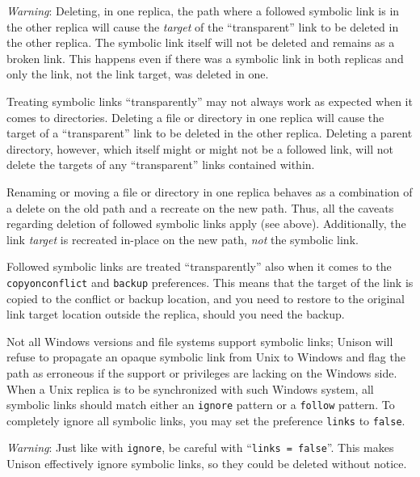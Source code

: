 \documentclass{article}
\begin{document}
{\em Warning}: Deleting, in one replica, the path where a followed symbolic
link is in the other replica will cause the {\em target} of the ``transparent''
link to be deleted in the other replica. The symbolic link itself will not be
deleted and remains as a broken link. %
This happens even if there was a symbolic link in both replicas and only the
link, not the link target, was deleted in one.

Treating symbolic links ``transparently'' may not always work as expected when
it comes to directories. Deleting a file or directory in one replica will cause
the target of a ``transparent'' link to be deleted in the other replica.
Deleting a parent directory, however, which itself might or might not be a
followed link, will not delete the targets of any ``transparent'' links
contained within. %

Renaming or moving a file or directory in one replica behaves as a combination
of a delete on the old path and a recreate on the new path. Thus, all the
caveats regarding deletion of followed symbolic links apply (see above).
Additionally, the link {\em target} is recreated in-place on the new path,
{\em not} the symbolic link.

Followed symbolic links are treated ``transparently'' also when it comes to the
\verb|copyonconflict| and \verb|backup| preferences. This means that the target
of the link is copied to the conflict or backup location, and you need to
restore to the original link target location outside the replica, should you
need the backup. %

Not all Windows versions and file systems support symbolic links; Unison will
refuse to propagate an opaque symbolic link from Unix to Windows and flag the
path as erroneous if the support or privileges are lacking on the Windows side.
When a Unix replica is to be synchronized with such Windows system, all symbolic
links should match either an \verb|ignore| pattern or a \verb|follow| pattern.
To completely ignore all symbolic links, you may set the preference {\tt links}
to {\tt false}.

{\em Warning}: Just like with \verb|ignore|, be careful with ``{\tt links =
false}''. This makes Unison effectively ignore symbolic links, so they could be
deleted without notice.
\end{document}
